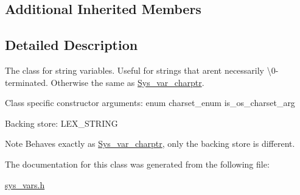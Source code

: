 \subsection*{Additional Inherited Members}


\subsection{Detailed Description}
The class for string variables. Useful for strings that aren\textquotesingle{}t necessarily \textbackslash{}0-\/terminated. Otherwise the same as \mbox{\hyperlink{classSys__var__charptr}{Sys\+\_\+var\+\_\+charptr}}.

Class specific constructor arguments\+: enum charset\+\_\+enum is\+\_\+os\+\_\+charset\+\_\+arg

Backing store\+: L\+E\+X\+\_\+\+S\+T\+R\+I\+NG

\begin{DoxyNote}{Note}
Behaves exactly as \mbox{\hyperlink{classSys__var__charptr}{Sys\+\_\+var\+\_\+charptr}}, only the backing store is different. 
\end{DoxyNote}


The documentation for this class was generated from the following file\+:\begin{DoxyCompactItemize}
\item 
\mbox{\hyperlink{sys__vars_8h}{sys\+\_\+vars.\+h}}\end{DoxyCompactItemize}
